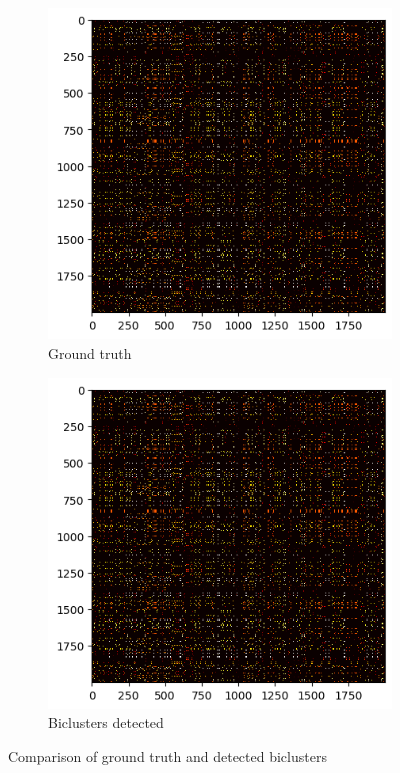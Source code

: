 \documentclass{beamer}
\begin{document}
\begin{frame}
\begin{columns}[T]
\begin{column}{0.5\textwidth}
            \begin{figure}[htb]
                \centering
                \begin{subfigure}[b]{\textwidth}
                    \centering
                    \includegraphics[width=0.6\linewidth]{image1.png}
                    \caption{Ground truth}
                    \label{fig:image1}
                \end{subfigure}
                \begin{subfigure}[b]{\textwidth}
                    \centering
                    \includegraphics[width=0.6\linewidth]{image2.png}
                    \caption{Biclusters detected}
                    \label{fig:image2}
                \end{subfigure}
                \vspace{-0.8cm}
                \caption{Comparison of ground truth and detected biclusters}
                \label{fig:comparison}
            \end{figure}
        \end{column}
    \end{columns}
\end{frame}
\end{document}
